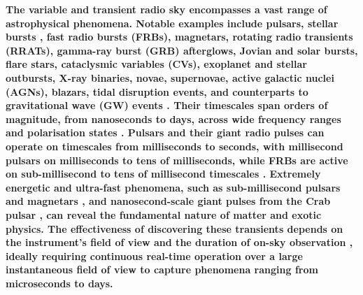 \documentclass[
  journal=pasa,
  manuscript=article-type,
  year=2020,
  volume=37,
]{cup-journal}
\begin{document}
\textbf{The variable and transient radio sky encompasses a vast range of astrophysical phenomena. Notable examples include pulsars, stellar bursts \citep{Zhang+2023}, fast radio bursts (FRBs), magnetars, rotating radio transients (RRATs), gamma-ray burst (GRB) afterglows, Jovian and solar bursts, flare stars, cataclysmic variables (CVs), exoplanet and stellar outbursts, X-ray binaries, novae, supernovae, active galactic nuclei (AGNs), blazars, tidal disruption events, and counterparts to gravitational wave (GW) events \citep{Lorimer+2007,Thyagarajan+2011,Keane2013,Thornton+2013,Bochenek+2020}. Their timescales span orders of magnitude, from nanoseconds to days, across wide frequency ranges and \textbf{polarisation states} \citep[][and references therein]{Pietka+2015,Chandra+2016,Nimmo+2022}. Pulsars and their giant radio pulses can operate on timescales from milliseconds to seconds, with millisecond pulsars on milliseconds to tens of milliseconds, while FRBs are active on sub-millisecond to tens of millisecond timescales \citep{Crawford+2022,Gupta+2022,Snelders+2023}. Extremely energetic and ultra-fast phenomena, such as sub-millisecond pulsars and magnetars \citep{Du+2009,Haskell+2018}, and nanosecond-scale giant pulses from the Crab pulsar \citep{Hankins+2003,Hankins+2007,Eilek+2016,Philippov+2019}, can reveal the fundamental nature of matter and exotic physics. The effectiveness of discovering these transients depends on the instrument's field of view and the duration of on-sky observation \citep{Cordes2007}, ideally requiring continuous real-time operation over a large instantaneous field of view to capture phenomena ranging from microseconds to days.}

\end{document}
